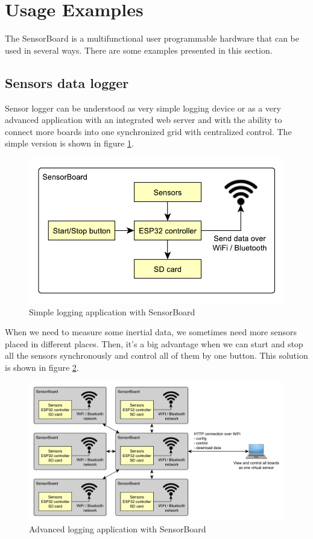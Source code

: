 \section{Usage Examples}
The SensorBoard is a multifunctional user programmable hardware that can be used in several ways. There are some examples presented in this section.

\subsection{Sensors data logger}
\label{ExampleLogger}
Sensor logger can be understood as very simple logging device or as a very advanced application with an integrated web server and with the ability to connect more boards into one synchronized grid with centralized control. The simple version is shown in figure \ref{UELogging1}.

\begin{figure}
	\centering
	\label{UELogging1}
	\caption{Simple logging application with SensorBoard}
	\includegraphics[scale=1]{img/UsageExamplesLogger1.pdf}
\end{figure}

When we need to measure some inertial data, we sometimes need more sensors placed in different places. Then, it's a big advantage when we can start and stop all the sensors synchronously and control all of them by one button. This solution is shown in figure \ref{UELogging2}.

\begin{figure}
	\centering
	\label{UELogging2}
	\caption{Advanced logging application with SensorBoard}
	\includegraphics[width=\linewidth]{img/UsageExamplesLogger2.pdf}
\end{figure}


